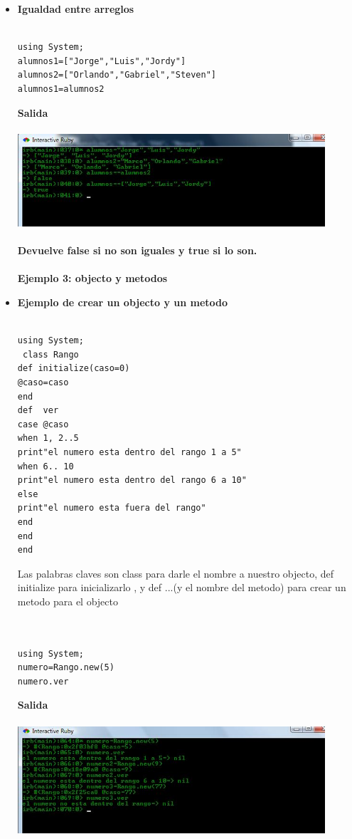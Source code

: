\documentclass[11pt]{article} %
\begin{document}
\begin{itemize}
    \item {\bf Igualdad entre arreglos}\\\\
\begin{lstlisting}[frame=single]  % Start your code-block
using System;
alumnos1=["Jorge","Luis","Jordy"]
alumnos2=["Orlando","Gabriel","Steven"]
alumnos1=alumnos2
\end{lstlisting}
\bf Salida\\\\
	    \includegraphics[width=0.9\textwidth]{./imagenes/igualdad_entre_arreglos}\\\\
Devuelve false si no son iguales y true si lo son.\\\\

 {\fontsize{14}{0} \bf Ejemplo 3: objecto y metodos\\}
  \item {\bf Ejemplo de crear un objecto y un metodo}\\\\
\begin{lstlisting}[frame=single]  % Start your code-block
using System;
 class Rango
def initialize(caso=0)
@caso=caso
end
def  ver
case @caso
when 1, 2..5
print"el numero esta dentro del rango 1 a 5"
when 6.. 10
print"el numero esta dentro del rango 6 a 10"
else
print"el numero esta fuera del rango"
end
end
end
\end{lstlisting}

	    
Las palabras claves son class para darle el nombre a nuestro objecto,  def  initialize  para inicializarlo , y def ...(y el nombre del metodo) para crear un metodo para el objecto\\\\

  	   \\
\begin{lstlisting}[frame=single]  % Start your code-block
using System;
numero=Rango.new(5)
numero.ver

\end{lstlisting}
\bf Salida\\\\
	    \includegraphics[width=0.9\textwidth]{./imagenes/uso_objecto}\\\\


\end{itemize}
\end{document}
